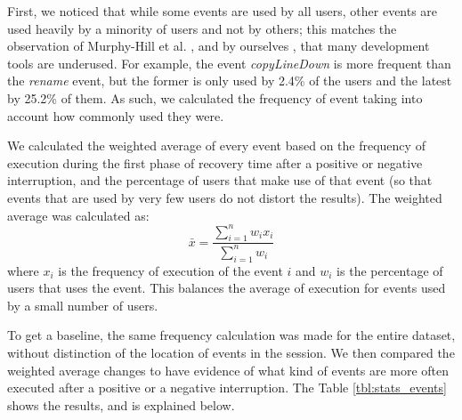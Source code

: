 \documentclass[times]{smrauth}
\begin{document}
First, we noticed that while some events are used by all users, other events are used heavily by a minority of users and not by others; this matches the observation of Murphy-Hill et al. \cite{MPB12}, and by ourselves \cite{KubelkaBCGRRS15}, that many development tools are underused. For example, the event \textit{copyLineDown} is more frequent than the \textit{rename} event, but the former is only used by 2.4\% of the users and the latest by 25.2\% of them. As such, we calculated the frequency of event taking into account how commonly used they were.

We calculated the weighted average of every event based on the frequency of execution during the first phase of recovery time after a positive or negative interruption, and the percentage of users that make use of that event (so that events that are used by very few users do not distort the results). The weighted average was calculated as: $$\bar{x} = \frac{\sum_{i=1}^{n}w_ix_i}{\sum_{i=1}^{n}w_i} $$where $x_i$ is the frequency of execution of the event $i$ and $w_i$ is the percentage of users that uses the event. This balances the average of execution for events used by a small number of users. 

To get a baseline, the same frequency calculation was made for the entire dataset, without distinction of the location of events in the session. We then compared the weighted average changes to have evidence of what kind of events are more often executed after a positive or a negative interruption. The Table \ref{tbl:stats_events} shows the results, and is explained below.
\end{document}
